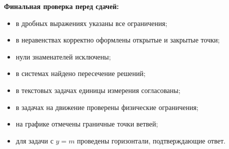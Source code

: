 \documentclass[a4paper,12pt]{article}
\begin{document}
\vspace{1em}

\textbf{Финальная проверка перед сдачей:}

\begin{itemize}

  \item
  в дробных выражениях указаны все ограничения;

  \item
  в неравенствах корректно оформлены открытые и закрытые точки;

  \item
  нули знаменателей исключены;

  \item
  в системах найдено пересечение решений;

  \item
  в текстовых задачах единицы измерения согласованы;

  \item
  в задачах на движение проверены физические ограничения;

  \item
  на графике отмечены граничные точки ветвей;

  \item
  для задачи с \(y=m\) проведены горизонтали, подтверждающие ответ.

\end{itemize}
\end{document}
